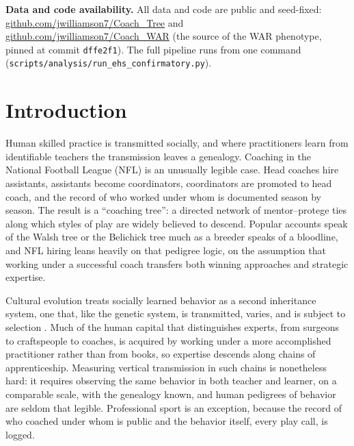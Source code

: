 \documentclass[11pt]{article}
\begin{document}
\noindent\textbf{Data and code availability.} All data and code are public and
seed-fixed: \href{https://github.com/jwilliamson7/Coach_Tree}{github.com/jwilliamson7/Coach\_Tree}
and \href{https://github.com/jwilliamson7/Coach_WAR}{github.com/jwilliamson7/Coach\_WAR}
(the source of the WAR phenotype, pinned at commit \texttt{dffe2f1}). The full
pipeline runs from one command (\texttt{scripts/analysis/run\_ehs\_confirmatory.py}).

\section{Introduction}

Human skilled practice is transmitted socially, and where practitioners learn from
identifiable teachers the transmission leaves a genealogy. Coaching in the National
Football League (NFL) is an unusually legible case. Head coaches hire assistants,
assistants become coordinators, coordinators are promoted to head coach, and the
record of who worked under whom is documented season by season. The result is a
``coaching tree'': a directed network of mentor--protege ties along which styles of
play are widely believed to descend. Popular accounts speak of the Walsh tree or
the Belichick tree much as a breeder speaks of a bloodline, and NFL hiring leans
heavily on that pedigree logic, on the assumption that working under a successful
coach transfers both winning approaches and strategic expertise.

Cultural evolution treats socially learned behavior as a second inheritance system,
one that, like the genetic system, is transmitted, varies, and is subject to
selection \citep{cavallisforza1981, boydricherson1985, henrich2016}. Much of the
human capital that distinguishes experts, from surgeons to craftspeople to coaches,
is acquired by working under a more accomplished practitioner rather than from
books, so expertise descends along chains of apprenticeship. Measuring vertical
transmission in such chains is nonetheless hard: it requires observing the same
behavior in both teacher and learner, on a comparable scale, with the genealogy
known, and human pedigrees of behavior are seldom that legible. Professional sport
is an exception, because the record of who coached under whom is public and the
behavior itself, every play call, is logged.
\end{document}
